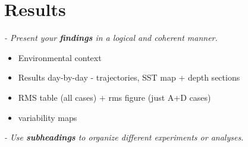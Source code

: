 \section{Results}
\textit{- Present your \textbf{findings} in a logical and coherent manner.}

\begin{itemize}
    \item Environmental context
    \item Results day-by-day - trajectories, SST map + depth sections
    \item RMS table (all cases) + rms figure (just A+D cases)
    \item variability maps
\end{itemize}

 
\textit{- Use \textbf{subheadings} to organize different experiments or analyses.}
